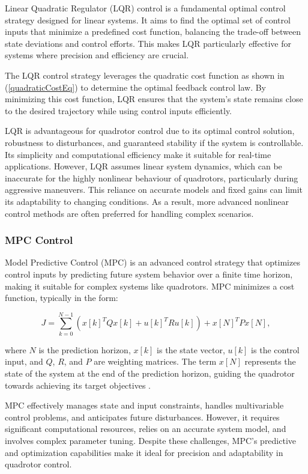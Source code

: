 \documentclass{UoNMCHA}
\numberwithin{equation}{section}
\begin{document}
Linear Quadratic Regulator (LQR) control is a fundamental optimal control strategy designed for linear systems. It aims to find the optimal set of control inputs that minimize a predefined cost function, balancing the trade-off between state deviations and control efforts. This makes LQR particularly effective for systems where precision and efficiency are crucial.

The LQR control strategy leverages the quadratic cost function as shown in (\ref{quadraticCostEq}) to determine the optimal feedback control law. By minimizing this cost function, LQR ensures that the system's state remains close to the desired trajectory while using control inputs efficiently. 


LQR is advantageous for quadrotor control due to its optimal control solution, robustness to disturbances, and guaranteed stability if the system is controllable. Its simplicity and computational efficiency make it suitable for real-time applications. However, LQR assumes linear system dynamics, which can be inaccurate for the highly nonlinear behaviour of quadrotors, particularly during aggressive maneuvers. This reliance on accurate models and fixed gains can limit its adaptability to changing conditions. As a result, more advanced nonlinear control methods are often preferred for handling complex scenarios. \cite{website:LQR}


\subsubsection{MPC Control}

Model Predictive Control (MPC) is an advanced control strategy that optimizes control inputs by predicting future system behavior over a finite time horizon, making it suitable for complex systems like quadrotors. MPC minimizes a cost function, typically in the form:

\begin{equation}
J = \sum_{k=0}^{N-1} \left( x[k]^T Q x[k] + u[k]^T R u[k] \right) + x[N]^T P x[N],
\end{equation}

where \( N \) is the prediction horizon, \( x[k] \) is the state vector, \( u[k] \) is the control input, and \( Q \), \( R \), and \( P \) are weighting matrices. The term \( x[N] \) represents the state of the system at the end of the prediction horizon, guiding the quadrotor towards achieving its target objectives \cite{MPC}.

MPC effectively manages state and input constraints, handles multivariable control problems, and anticipates future disturbances. However, it requires significant computational resources, relies on an accurate system model, and involves complex parameter tuning. Despite these challenges, MPC's predictive and optimization capabilities make it ideal for precision and adaptability in quadrotor control.
\end{document}
